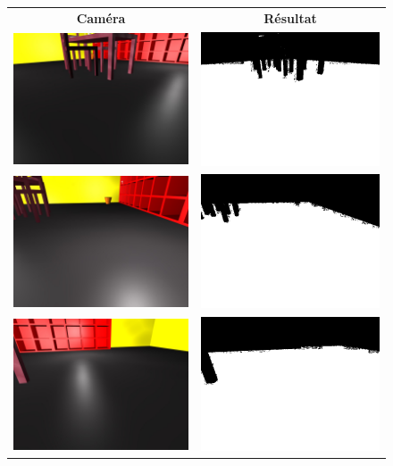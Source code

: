 \begin{figure}
    \begin{center}
        \begin{tabular}{cc}
            \textbf{Caméra} & \textbf{Résultat} \\
            \includegraphics[width=0.4\linewidth]{rcs/abodv0s.png} & \includegraphics[width=0.4\linewidth]{rcs/abodv0r.png} \\
            \includegraphics[width=0.4\linewidth]{rcs/abodv1s.png} & \includegraphics[width=0.4\linewidth]{rcs/abodv1r.png} \\
            \includegraphics[width=0.4\linewidth]{rcs/abodv2s.png} & \includegraphics[width=0.4\linewidth]{rcs/abodv2r.png} \\

\end{tabular}
\end{center}
\end{figure}
